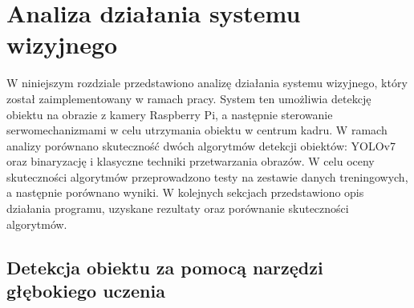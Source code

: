 \documentclass[a4paper,twoside,12pt]{book}
\begin{document}







%      


\chapter{Analiza działania systemu wizyjnego}
\label{ch:05}
W niniejszym rozdziale przedstawiono analizę działania systemu wizyjnego, który został zaimplementowany w ramach pracy. System ten umożliwia detekcję obiektu na obrazie z kamery Raspberry Pi, a następnie sterowanie serwomechanizmami w celu utrzymania obiektu w centrum kadru. W ramach analizy porównano skuteczność dwóch algorytmów detekcji obiektów: YOLOv7 oraz binaryzację i klasyczne techniki przetwarzania obrazów. W celu oceny skuteczności algorytmów przeprowadzono testy na zestawie danych treningowych, a następnie porównano wyniki. W kolejnych sekcjach przedstawiono opis działania programu, uzyskane rezultaty oraz porównanie skuteczności algorytmów.

\section{Detekcja obiektu za pomocą narzędzi głębokiego uczenia}
\newpage
\end{document}

